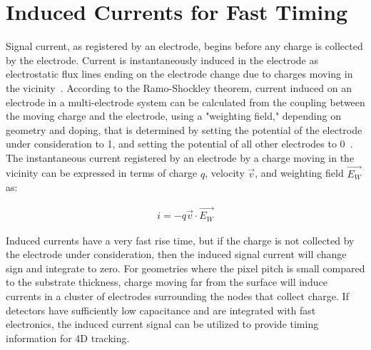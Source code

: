 \section{Induced Currents for Fast Timing}
Signal current, as registered by an electrode, begins before any charge is collected by the electrode.  
Current is instantaneously induced in the electrode as electrostatic flux lines ending on the electrode change due to charges moving in the vicinity~\cite{doi:10.1063/1.1710367}.
According to the Ramo-Shockley theorem, current induced on an electrode in a multi-electrode system can be calculated from the coupling between the moving charge and the electrode, using a "weighting field," depending on geometry and doping, that is determined by setting the potential of the electrode under consideration to 1, and setting the potential of all other electrodes to 0~\cite{1686997}.
The instantaneous current registered by an electrode by a charge moving in the vicinity can be expressed in terms of charge $q$, velocity $\vec{v}$, and weighting field $\vec{E_W}$ as:
\begin{linenomath*}
\begin{align}
i = -q \vec{v} \cdot \vec{E_W}
\end{align}
\end{linenomath*}
Induced currents have a very fast rise time, but if the charge is not collected by the electrode under consideration, then the induced signal current will change sign and integrate to zero.
For geometries where the pixel pitch is small compared to the substrate thickness, charge moving far from the surface will induce currents in a cluster of electrodes surrounding the nodes that collect charge.
If detectors have sufficiently low capacitance and are integrated with fast electronics, the induced current signal can be utilized to provide timing information for 4D tracking.

